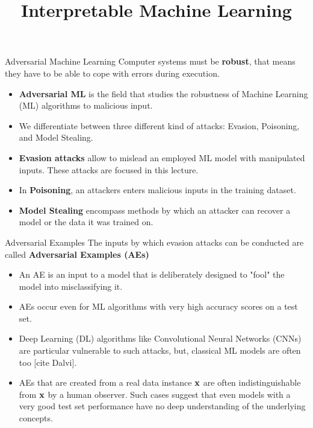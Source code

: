 \documentclass[11pt,compress,t,notes=noshow, xcolor=table]{beamer}
\title{Interpretable Machine Learning}
\institute{\href{https://compstat-lmu.github.io/lecture_i2ml/}{compstat-lmu.github.io/lecture\_i2ml}}
\date{}
\begin{document}
\newcommand{\vertiii}[1]{{\left\vert\kern-0.25ex\left\vert\kern-0.25ex\left\vert #1 
    \right\vert\kern-0.25ex\right\vert\kern-0.25ex\right\vert}}








\begin{vbframe}{Adversarial Machine Learning}
Computer systems must be \textbf{robust}, that means they have to be able to cope with errors during execution.
\begin{itemize}
\item \textbf{Adversarial ML} is the field that studies the robustness of Machine Learning (ML) algorithms to malicious input.
\item We differentiate between three different kind of attacks: Evasion, Poisoning, and Model Stealing.
\item \textbf{Evasion attacks} allow to mislead an employed ML model with manipulated inputs. These attacks are focused in this lecture.
\item In \textbf{Poisoning}, an attackers enters malicious inputs in the training dataset.
\item \textbf{Model Stealing} encompass methods by which an attacker can recover a model or the data it was trained on.
\end{itemize}
\end{vbframe}

\begin{vbframe}{Adversarial Examples}
The inputs by which evasion attacks can be conducted are called \textbf{Adversarial Examples (AEs)}
\begin{itemize}
\item An AE is an input to a model that is deliberately designed to "fool" the model into misclassifying it.
\item AEs occur even for ML algorithms with very high accuracy scores on a test set.
\item Deep Learning (DL) algorithms like Convolutional Neural Networks (CNNs) are particular vulnerable to such attacks, but, classical ML models are often too [cite Dalvi].
\item AEs that are created from a real data instance $\xv$ are often indistinguishable from $\xv$ by a human observer. Such cases suggest that even models with a very good test set performance have no deep understanding of the underlying concepts.%
\end{itemize}
\end{vbframe}
\end{document}
